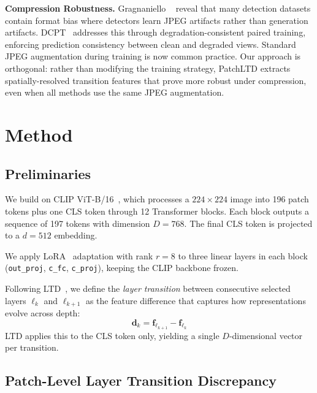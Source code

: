 \documentclass[runningheads]{llncs}
\newcommand{\ours}{PatchLTD}
\begin{document}
\noindent\textbf{Compression Robustness.}
Gragnaniello \etal~\cite{fakeorjpeg2024} reveal that many detection datasets contain format bias where detectors learn JPEG artifacts rather than generation artifacts.
DCPT~\cite{dcpt2026} addresses this through degradation-consistent paired training, enforcing prediction consistency between clean and degraded views.
Standard JPEG augmentation during training is now common practice.
Our approach is orthogonal: rather than modifying the training strategy, \ours{} extracts spatially-resolved transition features that prove more robust under compression, even when all methods use the same JPEG augmentation.


\section{Method}
\label{sec:method}

\subsection{Preliminaries}
\label{sec:prelim}

We build on CLIP ViT-B/16~\cite{radford2021clip}, which processes a $224{\times}224$ image into 196 patch tokens plus one CLS token through 12 Transformer blocks.
Each block outputs a sequence of 197 tokens with dimension $D{=}768$.
The final CLS token is projected to a $d{=}512$ embedding.

We apply LoRA~\cite{hu2022lora} adaptation with rank $r{=}8$ to three linear layers in each block (\texttt{out\_proj}, \texttt{c\_fc}, \texttt{c\_proj}), keeping the CLIP backbone frozen.

Following LTD~\cite{yang2026ltd}, we define the \emph{layer transition} between consecutive selected layers $\ell_k$ and $\ell_{k+1}$ as the feature difference that captures how representations evolve across depth:
\begin{equation}
    \mathbf{d}_k = \mathbf{f}_{\ell_{k+1}} - \mathbf{f}_{\ell_k}
\end{equation}
LTD applies this to the CLS token only, yielding a single $D$-dimensional vector per transition.

\subsection{Patch-Level Layer Transition Discrepancy}
\label{sec:patchltd}
\end{document}
